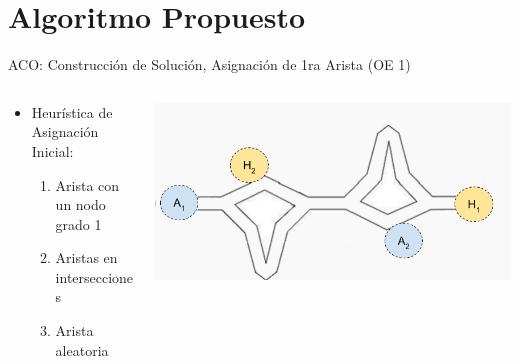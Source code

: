 

\section{Algoritmo Propuesto}

\begin{frame}{ACO: Construcci\'on de Soluci\'on, Asignaci\'on de 1ra Arista (OE 1)}
    \begin{columns}
        \begin{column}{0.3\textwidth}
            \begin{itemize}
                \item Heur\'istica de Asignaci\'on Inicial: \begin{enumerate}
                    \item Arista con un nodo grado 1
                    \item Aristas en intersecciones
                    \item Arista aleatoria
                \end{enumerate}
                
            \end{itemize}
        \end{column}
        \begin{column}{0.7\textwidth}
            \centering
            \includegraphics[scale=0.5]{Pictures/ant-initial-edge.png}
        \end{column}
    \end{columns}
\end{frame}

